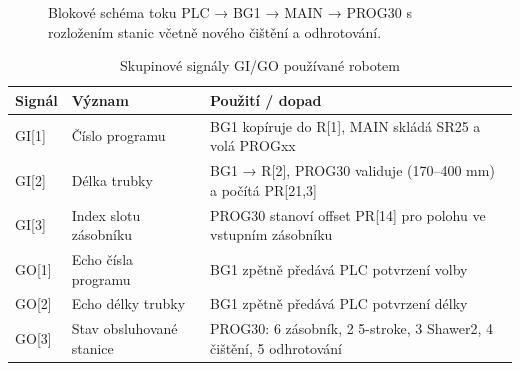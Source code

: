\begin{figure}[H]
  \caption{Blokové schéma toku PLC → BG1 → MAIN → PROG30 s rozložením stanic včetně nového čištění a odhrotování.}
\end{figure}

\begin{table}[H]
  \centering
  \caption{Skupinové signály GI/GO používané robotem}
  \begin{tabular}{lll}
    \toprule
    Signál & Význam & Použití / dopad \\
    \midrule
    GI[1] & Číslo programu & BG1 kopíruje do R[1], MAIN skládá SR25 a volá PROGxx \\
    GI[2] & Délka trubky & BG1 → R[2], PROG30 validuje (170--400 mm) a počítá PR[21,3] \\
    GI[3] & Index slotu zásobníku & PROG30 stanoví offset PR[14] pro polohu ve vstupním zásobníku \\
    GO[1] & Echo čísla programu & BG1 zpětně předává PLC potvrzení volby \\
    GO[2] & Echo délky trubky & BG1 zpětně předává PLC potvrzení délky \\
    GO[3] & Stav obsluhované stanice & PROG30: 6 zásobník, 2 5-stroke, 3 Shawer2, 4 čištění, 5 odhrotování \\
    \bottomrule
  \end{tabular}
\end{table}

